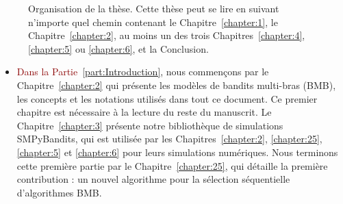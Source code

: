 \begin{resume_fr}
\begin{figure}[h!]
{
    }
    \caption[Organisation de la thèse : une carte de lecture.]{Organisation de la thèse. Cette thèse peut se lire en suivant n'importe quel chemin contenant le Chapitre~\ref{chapter:1}, le Chapitre~\ref{chapter:2}, au moins un des trois Chapitres~\ref{chapter:4}, \ref{chapter:5} ou \ref{chapter:6}, et la Conclusion.}
    \label{fig:1:organization_fr}
\end{figure}

\begin{itemize}
    \item
\textcolor{darkred}{Dans la Partie~\ref{part:Introduction}}, nous commençons par le Chapitre~\ref{chapter:2} qui présente les modèles de bandits multi-bras (BMB), les concepts et les notations utilisés dans tout ce document. Ce premier chapitre est nécessaire à la lecture du reste du manuscrit.
Le Chapitre~\ref{chapter:3} présente notre bibliothèque de simulations SMPyBandits, qui est utilisée par les Chapitres~\ref{chapter:2}, \ref{chapter:25}, \ref{chapter:5} et \ref{chapter:6} pour leurs simulations numériques.
Nous terminons cette première partie par le Chapitre~\ref{chapter:25},
qui détaille la première contribution : un nouvel algorithme pour la sélection séquentielle d'algorithmes BMB.


\end{itemize}
\end{resume_fr}
